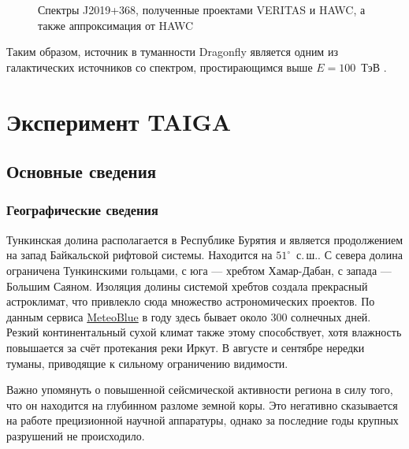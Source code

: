 \documentclass[magd,floatypics,numeref]{msudipl} %
\begin{document}
\begin{figure}[b]
	\noindent{}
	\caption{Спектры J2019+368, полученные проектами VERITAS и HAWC, а также аппроксимация от HAWC}
	\label{pic:HAWCJ2019368Spectra}
\end{figure}

Таким образом, источник в туманности Dragonfly является одним из галактических источников со спектром, простирающимся выше $E=100$~ТэВ \cite{https://doi.org/10.48550/arxiv.2109.13753}. 	
\chapter{Эксперимент TAIGA}
\section{Основные сведения}
\subsection{Географические сведения}
Тункинская долина располагается в Республике Бурятия и является продолжением на запад Байкальской рифтовой системы.  Находится на $51^{\circ}$~с.\,ш.. С севера долина ограничена Тункинскими гольцами, с юга --- хребтом Хамар-Дабан, с запада --- Большим Саяном. Изоляция долины системой хребтов создала прекрасный астроклимат, что привлекло сюда множество астрономических проектов. По данным сервиса \href{https://www.meteoblue.com}{MeteoBlue}
в году здесь бывает около 300 солнечных дней. Резкий континентальный сухой климат также этому способствует, хотя влажность повышается за счёт протекания реки Иркут. В августе и сентябре нередки туманы, приводящие к сильному ограничению видимости. 

Важно упомянуть о повышенной сейсмической активности региона в силу того, что он находится на глубинном разломе земной коры. Это негативно сказывается на работе прецизионной научной аппаратуры, однако за последние годы крупных разрушений не происходило.
\end{document}
